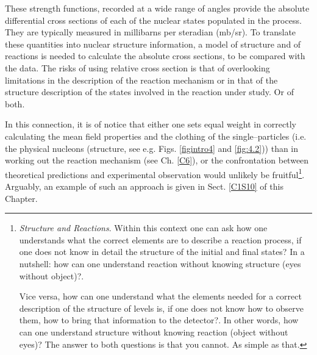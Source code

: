These strength functions, recorded at a wide range of angles provide the absolute differential cross sections of each of the nuclear states populated in the process. They are  typically measured in millibarns per  steradian (mb/sr). To translate these quantities into nuclear structure information, a model of structure and of reactions is needed to calculate the absolute cross sections, to be compared with the data. The risks of using relative cross section is that of overlooking limitations in the description of the reaction mechanism or in that of the structure description of the states involved in the reaction under study. Or of both.

In this connection, it is of notice that either one sets equal weight in correctly calculating the mean field properties and the clothing of the single--particles (i.e. the physical nucleons (structure, see e.g. Figs. \ref{figintro4} and \ref{fig:4.2})) than in working out the reaction mechanism (see Ch. \ref{C6}), or the confrontation between theoretical predictions and experimental observation would unlikely be fruitful\footnote{\textit{Structure and Reactions}. Within this context one can ask how one understands what the correct elements are to describe a reaction process, if one does not know in detail the structure of the initial and final states? In a nutshell: how can one understand reaction without knowing structure (eyes without object)?. 


Vice versa, how can one understand what the elements needed for a correct description of the structure of levels is, if one does not know how to observe them, how to bring that information to the detector?. In other words, how can one understand structure without knowing reaction (object without eyes)? The answer to both questions is that you cannot. As simple as that.}. Arguably, an example of such an approach is given in Sect. \ref{C1S10} of this Chapter.


